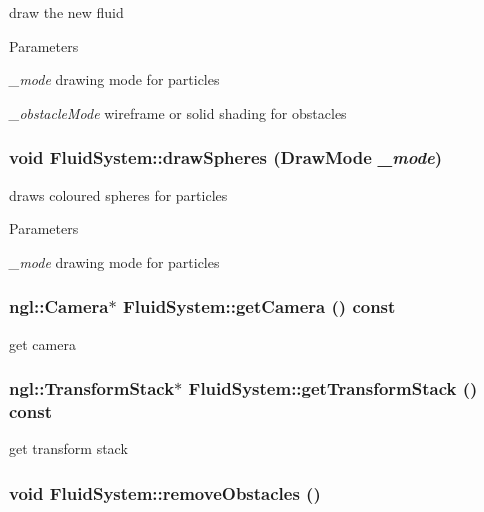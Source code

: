 draw the new fluid 
\begin{DoxyParams}{Parameters}
\item[{\em \_\-mode}]drawing mode for particles \item[{\em \_\-obstacleMode}]wireframe or solid shading for obstacles \end{DoxyParams}
\hypertarget{classFluidSystem_a26bb00d14f54788b55f18135f653006b}{
\subsubsection[{drawSpheres}]{\setlength{\rightskip}{0pt plus 5cm}void FluidSystem::drawSpheres ({\bf DrawMode} {\em \_\-mode})}}
\label{classFluidSystem_a26bb00d14f54788b55f18135f653006b}


draws coloured spheres for particles 
\begin{DoxyParams}{Parameters}
\item[{\em \_\-mode}]drawing mode for particles \end{DoxyParams}
\hypertarget{classFluidSystem_a2b41f17fbf8fe86977323771e83c5531}{
\subsubsection[{getCamera}]{\setlength{\rightskip}{0pt plus 5cm}ngl::Camera$\ast$ FluidSystem::getCamera () const}}
\label{classFluidSystem_a2b41f17fbf8fe86977323771e83c5531}


get camera \hypertarget{classFluidSystem_a961c577b66bbe91d8cef8889a1b4a9b1}{
\subsubsection[{getTransformStack}]{\setlength{\rightskip}{0pt plus 5cm}ngl::TransformStack$\ast$ FluidSystem::getTransformStack () const}}
\label{classFluidSystem_a961c577b66bbe91d8cef8889a1b4a9b1}


get transform stack \hypertarget{classFluidSystem_af1f59f82a964eacdb1c3618f804fa7a3}{
\subsubsection[{removeObstacles}]{\setlength{\rightskip}{0pt plus 5cm}void FluidSystem::removeObstacles ()}}
\label{classFluidSystem_af1f59f82a964eacdb1c3618f804fa7a3}


